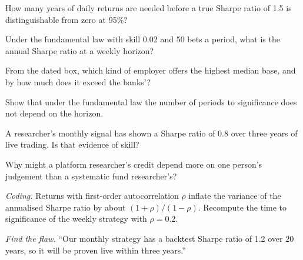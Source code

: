 \begin{exercise}[$\star$]\label{exo:in:quant-researcher:1}
How many years of daily returns are needed before a true Sharpe ratio of 1.5 is distinguishable from zero at 95\%?
\end{exercise}

\begin{exercise}[$\star$]\label{exo:in:quant-researcher:2}
Under the fundamental law with skill 0.02 and 50 bets a period, what is the annual Sharpe ratio at a weekly horizon?
\end{exercise}

\begin{exercise}[$\star$]\label{exo:in:quant-researcher:3}
From the dated box, which kind of employer offers  the highest median base, and by how much does it
exceed the banks'?
\end{exercise}

\begin{exercise}[$\star\star$]\label{exo:in:quant-researcher:4}
Show that under the fundamental law the number of periods to significance does not depend on the horizon.
\end{exercise}

\begin{exercise}[$\star\star$]\label{exo:in:quant-researcher:5}
A researcher's monthly signal has shown a Sharpe ratio of 0.8 over three years of live trading. Is that evidence of skill?
\end{exercise}

\begin{exercise}[$\star\star$]\label{exo:in:quant-researcher:6}
Why might a platform researcher's credit depend more on one person's judgement than a systematic fund researcher's?
\end{exercise}

\begin{exercise}[$\star\star\star$]\label{exo:in:quant-researcher:7}
\emph{Coding.} Returns with first-order autocorrelation $\rho$ inflate the variance of the annualised Sharpe ratio by about
$(1+\rho)/(1-\rho)$. Recompute the time to significance of the weekly strategy with $\rho=0.2$.
\end{exercise}

\begin{exercise}[$\star\star\star$]\label{exo:in:quant-researcher:8}
\emph{Find the flaw.} ``Our monthly strategy has a backtest Sharpe ratio of 1.2 over 20 years, so it will be proven live
within three years.''
\end{exercise}

